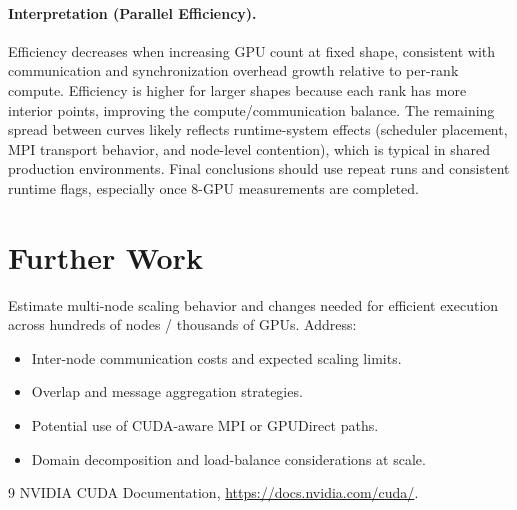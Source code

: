 \documentclass[11pt]{article}
\begin{document}
\paragraph{Interpretation (Parallel Efficiency).}
Efficiency decreases when increasing GPU count at fixed shape, consistent with communication and synchronization overhead growth relative to per-rank compute. Efficiency is higher for larger shapes because each rank has more interior points, improving the compute/communication balance. The remaining spread between curves likely reflects runtime-system effects (scheduler placement, MPI transport behavior, and node-level contention), which is typical in shared production environments. Final conclusions should use repeat runs and consistent runtime flags, especially once 8-GPU measurements are completed.

\section{Further Work}
Estimate multi-node scaling behavior and changes needed for efficient execution across hundreds of nodes / thousands of GPUs. Address:
\begin{itemize}[leftmargin=*]
\item Inter-node communication costs and expected scaling limits.
\item Overlap and message aggregation strategies.
\item Potential use of CUDA-aware MPI or GPUDirect paths.
\item Domain decomposition and load-balance considerations at scale.
\end{itemize}

\begin{thebibliography}{9}
NVIDIA CUDA Documentation, \url{https://docs.nvidia.com/cuda/}.
\end{thebibliography}
\end{document}
